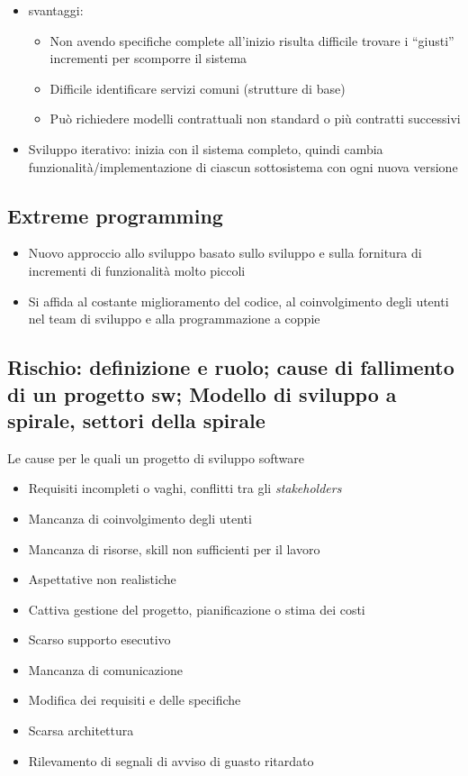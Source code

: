 \begin{itemize}
    \item svantaggi:
    \begin{itemize}
        \item Non avendo specifiche complete all'inizio risulta difficile trovare i \enquote{giusti} incrementi per scomporre il sistema
        \item Difficile identificare servizi comuni (strutture di base)
        \item Può richiedere modelli contrattuali non standard o più contratti successivi
    \end{itemize}
    
    \item Sviluppo iterativo: inizia con il sistema completo, quindi cambia funzionalità/implementazione di ciascun sottosistema con ogni nuova versione
\end{itemize}

\subsection{Extreme programming}
\begin{itemize}
    \item Nuovo approccio allo sviluppo basato sullo sviluppo e sulla fornitura di incrementi di funzionalità molto piccoli
    \item Si affida al costante miglioramento del codice, al coinvolgimento degli utenti nel team di sviluppo e alla programmazione a coppie
\end{itemize}
\subsection{Rischio: definizione e ruolo; cause di fallimento di un progetto sw; Modello di sviluppo a spirale, settori della spirale}
Le cause per le quali un progetto di sviluppo software
\begin{itemize}
    \item Requisiti incompleti o vaghi, conflitti tra gli \textit{stakeholders}
    \item Mancanza di coinvolgimento degli utenti
    \item Mancanza di risorse, skill non sufficienti per il lavoro
    \item Aspettative non realistiche
    \item Cattiva gestione del progetto, pianificazione o stima dei costi
    \item Scarso supporto esecutivo
    \item Mancanza di comunicazione
    \item Modifica dei requisiti e delle specifiche
    \item Scarsa architettura
    \item Rilevamento di segnali di avviso di guasto ritardato
\end{itemize}

